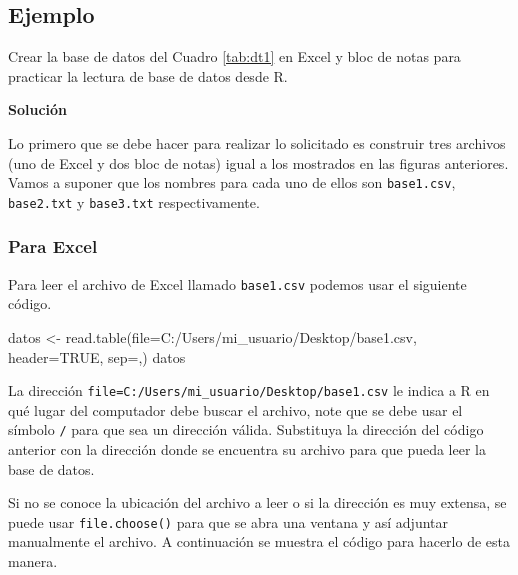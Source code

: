 \documentclass[
]{book}
\makeatletter
\newenvironment{Shaded}{\begin{snugshade}}{\end{snugshade}}
\newcommand{\AttributeTok}[1]{\textcolor[rgb]{0.77,0.63,0.00}{#1}}
\newcommand{\ConstantTok}[1]{\textcolor[rgb]{0.00,0.00,0.00}{#1}}
\newcommand{\FunctionTok}[1]{\textcolor[rgb]{0.00,0.00,0.00}{#1}}
\newcommand{\NormalTok}[1]{#1}
\newcommand{\OtherTok}[1]{\textcolor[rgb]{0.56,0.35,0.01}{#1}}
\newcommand{\StringTok}[1]{\textcolor[rgb]{0.31,0.60,0.02}{#1}}
\newenvironment{kframe}{%
\medskip{}
\setlength{\fboxsep}{.8em}
 \def\at@end@of@kframe{}%
 \ifinner\ifhmode%
  \def\at@end@of@kframe{\end{minipage}}%
  \begin{minipage}{\columnwidth}%
 \fi\fi%
 \def\FrameCommand##1{\hskip\@totalleftmargin \hskip-\fboxsep
 \colorbox{shadecolor}{##1}\hskip-\fboxsep
     \hskip-\linewidth \hskip-\@totalleftmargin \hskip\columnwidth}%
 \MakeFramed {\advance\hsize-\width
   \@totalleftmargin\z@ \linewidth\hsize
   \@setminipage}}%
 {\par\unskip\endMakeFramed%
 \at@end@of@kframe}
\renewenvironment{Shaded}{\begin{kframe}}{\end{kframe}}
\makeatother
\begin{document}
\hypertarget{ejemplo-24}{%
\subsection*{Ejemplo}\label{ejemplo-24}}

Crear la base de datos del Cuadro \ref{tab:dt1} en Excel y bloc de notas para practicar la lectura de base de datos desde R.

\textbf{Solución}

Lo primero que se debe hacer para realizar lo solicitado es construir tres archivos (uno de Excel y dos bloc de notas) igual a los mostrados en las figuras anteriores. Vamos a suponer que los nombres para cada uno de ellos son \texttt{base1.csv}, \texttt{base2.txt} y \texttt{base3.txt} respectivamente.

\hypertarget{para-excel}{%
\subsubsection*{Para Excel}\label{para-excel}}

Para leer el archivo de Excel llamado \texttt{base1.csv} podemos usar el siguiente código.

\begin{Shaded}
\begin{Highlighting}[]
\NormalTok{datos }\OtherTok{\textless{}{-}} \FunctionTok{read.table}\NormalTok{(}\AttributeTok{file=}\StringTok{\textquotesingle{}C:/Users/mi\_usuario/Desktop/base1.csv\textquotesingle{}}\NormalTok{,}
                    \AttributeTok{header=}\ConstantTok{TRUE}\NormalTok{, }\AttributeTok{sep=}\StringTok{\textquotesingle{},\textquotesingle{}}\NormalTok{)}
\NormalTok{datos}
\end{Highlighting}
\end{Shaded}

La dirección \texttt{file=\textquotesingle{}C:/Users/mi\_usuario/Desktop/base1.csv\textquotesingle{}} le indica a R en qué lugar del computador debe buscar el archivo, note que se debe usar el símbolo \texttt{/} para que sea un dirección válida. Substituya la dirección del código anterior con la dirección donde se encuentra su archivo para que pueda leer la base de datos.

Si no se conoce la ubicación del archivo a leer o si la dirección es muy extensa, se puede usar \texttt{file.choose()} para que se abra una ventana y así adjuntar manualmente el archivo. A continuación se muestra el código para hacerlo de esta manera.
\end{document}
